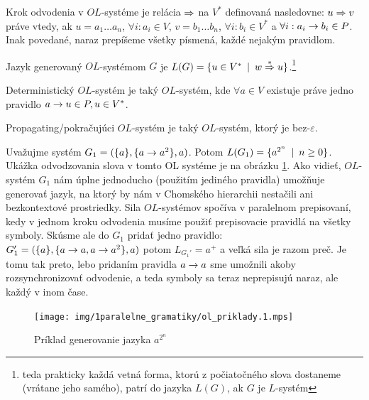 \begin{definicia}
    Krok odvodenia v $OL$-systéme je relácia $\Rightarrow$ na $V^{*}$ definovaná
    nasledovne: $u\Rightarrow v$ práve vtedy, ak $u=a_{1} \dots a_{n}$,
    $\forall i: a_{i} \in V$, $v=b_{1} \dots b_{n}$, 
    $\forall i: b_{i} \in V^{*}$ a 
    $\forall i: a_{i} \rightarrow b_{i} \in P$. 
    Inak povedané, naraz prepíšeme všetky písmená, každé nejakým
    pravidlom.
\end{definicia}

\begin{definicia}
    Jazyk generovaný $OL$-systémom $G$ je 
    $L(G)=\{u\in V^{*} \enspace |\enspace w \overset{*}{\Rightarrow} u\}$.\footnote{teda prakticky
        každá vetná forma, ktorú z
        počiatočného slova dostaneme (vrátane jeho samého), patrí do
        jazyka $L(G)$, ak $G$ je $L$-systém
        }
\end{definicia}

\begin{definicia}
    Deterministický $OL$-systém je taký $OL$-systém,
    kde $\forall a\in V$ existuje práve jedno pravidlo
    $a \rightarrow u\in P, u\in V^*$.
\end{definicia}

\begin{definicia}
    Propagating/pokračujúci $OL$-systém je taký $OL$-systém, ktorý
    je bez-$\varepsilon$.
\end{definicia}

\begin{priklad}
    Uvažujme systém $G_1=(\{ a \},\{ a \rightarrow a^2\}, a)$.
    Potom $L(G_1)=\{ a^{2^n} \enspace |\enspace n \ge 0\}$.
    Ukážka odvodzovania slova v tomto OL systéme je na obrázku 
    \ref{img:ol_priklad_1}.
    Ako vidieť, $OL$-systém $G_1$ nám úplne jednoducho 
    (použitím jediného pravidla) umožňuje
    generovať jazyk, na ktorý by nám v Chomského hierarchii
    nestačili ani bezkontextové prostriedky.
    Sila $OL$-systémov spočíva v paralelnom prepisovaní,
    kedy v jednom kroku odvodenia
    musíme použiť prepisovacie pravidlá na všetky symboly.
    Skúsme ale do $G_1$ pridať jedno pravidlo:\\
    $G_{1}'=(\{ a \},\{ a\rightarrow a,
    a \rightarrow a^2 \}, a)$ potom $L_{G_1'}=a^{+}$ a veľká sila je razom
    preč. Je tomu tak preto, lebo pridaním pravidla $a\rightarrow a$ sme
    umožnili akoby rozsynchronizovať odvodenie, a teda symboly sa
    teraz neprepisujú naraz, ale každý v inom čase.

    \begin{figure}[htp]
        \centering
        \texttt{[image: img/1paralelne\_gramatiky/ol\_priklady.1.mps]}
        \caption{Príklad generovanie jazyka $a^{2^n}$}
        \label{img:ol_priklad_1}
    \end{figure}
\end{priklad}


